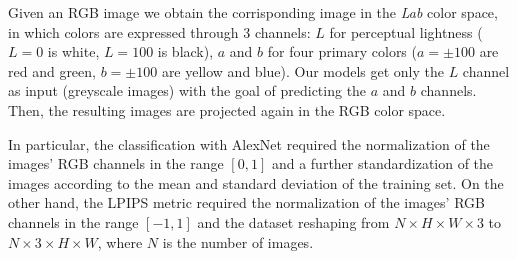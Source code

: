 Given an RGB image
we obtain the corrisponding image in the \textit{Lab} color space, in which colors are expressed through 3
channels: $L$ for perceptual lightness ($L=0$ is white, $L=100$ is black), $a$ and $b$ for
four primary colors ($a=\pm100$ are red and green, $b=\pm100$ are yellow and blue). Our models get only the $L$ channel as input (greyscale images) with the goal of predicting the $a$ and $b$
channels. Then, the resulting images are projected again in the RGB color space.

In particular, the classification with AlexNet required the normalization of the images' RGB channels in the
range $[0,1]$ and a further standardization of the images according to the mean and standard deviation of the
training set. On the other hand, the LPIPS metric required the normalization of the images' RGB channels in the range $[-1,1]$ and
the dataset reshaping from $N\times H\times W\times3$ to $N\times3\times H\times W$, where $N$ is the number of images.